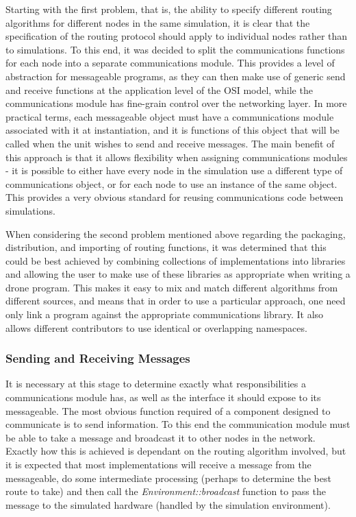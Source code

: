Starting with the first problem, that is, the ability to specify different routing algorithms for different nodes in the same simulation, it is clear that the specification of the routing protocol should apply to individual nodes rather than to simulations. To this end, it was decided to split the communications functions for each node into a separate communications module. This provides a level of abstraction for messageable programs, as they can then make use of generic send and receive functions at the application level of the OSI model, while the communications module has fine-grain control over the networking layer. In more practical terms, each messageable object must have a communications module associated with it at instantiation, and it is functions of this object that will be called when the unit wishes to send and receive messages. The main benefit of this approach is that it allows flexibility when assigning communications modules - it is possible to either have every node in the simulation use a different type of communications object, or for each node to use an instance of the same object. This provides a very obvious standard for reusing communications code between simulations.

When considering the second problem mentioned above regarding the packaging, distribution, and importing of routing functions, it was determined that this could be best achieved by combining collections of implementations into libraries and allowing the user to make use of these libraries as appropriate when writing a drone program. This makes it easy to mix and match different algorithms from different sources, and means that in order to use a particular approach, one need only link a program against the appropriate communications library. It also allows different contributors to use identical or overlapping namespaces.

\subsubsection{Sending and Receiving Messages}
It is necessary at this stage to determine exactly what responsibilities a communications module has, as well as the interface it should expose to its messageable. The most obvious function required of a component designed to communicate is to send information. To this end the communication module must be able to take a message and broadcast it to other nodes in the network. Exactly how this is achieved is dependant on the routing algorithm involved, but it is expected that most implementations will receive a message from the messageable, do some intermediate processing (perhaps to determine the best route to take) and then call the \textit{Environment::broadcast} function to pass the message to the simulated hardware (handled by the simulation environment).


